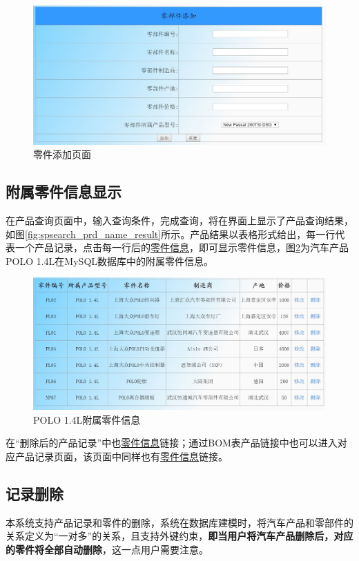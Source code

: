 \begin{figure}[H]
\centering
\includegraphics[width=0.8\linewidth]{figure/part_index1}
\caption{零件添加页面}
\label{fig:part_index1}
\end{figure}

\subsection{附属零件信息显示}
在产品查询页面中，输入查询条件，完成查询，将在界面上显示了产品查询结果，如图\ref{fig:spsearch_prd_name_result}所示。产品结果以表格形式给出，每一行代表一个产品记录，点击每一行后的\underline{零件信息}，即可显示零件信息，图\ref{fig:POLO_part_infDetail}为汽车产品POLO 1.4L在MySQL数据库中的附属零件信息。
\begin{figure}[H]
\centering
\includegraphics[width=0.8\linewidth]{figure/POLO_part_infDetail}
\caption{POLO 1.4L附属零件信息}
\label{fig:POLO_part_infDetail}
\end{figure}

在``删除后的产品记录''中也\underline{零件信息}链接；通过BOM表产品链接中也可以进入对应产品记录页面，该页面中同样也有\underline{零件信息}链接。
\subsection{记录删除}
本系统支持产品记录和零件的删除，系统在数据库建模时，将汽车产品和零部件的关系定义为``一对多''的关系，且支持外键约束，\textbf{即当用户将汽车产品删除后，对应的零件将全部自动删除}，这一点用户需要注意。

